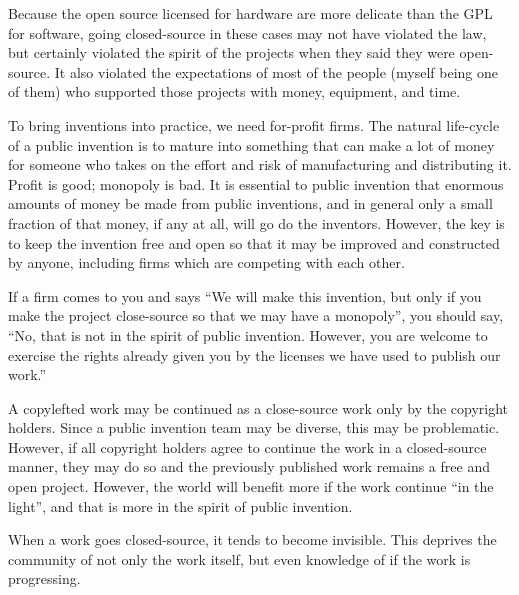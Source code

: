 \documentclass[
	fontsize=10pt, %
	twoside=false, %
	secnumdepth=1, %
]{kaobook}
\begin{document}
Because the open source licensed for hardware are
more delicate than the GPL for software, going
closed-source in these cases may not have violated
the law, but certainly violated the spirit of the
projects when they said they were open-source.
It also violated the expectations of most
of the people (myself being one of them)
who supported those projects with money,
equipment, and time.

To bring inventions into practice, we need
for-profit firms. The natural life-cycle
of a public invention is to mature into
something that can make a lot of money
for someone who takes on the effort and
risk of manufacturing and distributing it.
Profit is good; monopoly is bad.
It is essential to public invention that
enormous amounts of money be made from public inventions,
and in general only a small fraction of that money,
if any at all, will go do the inventors.
However, the key is to keep the invention
free and open so that it may be improved
and constructed by anyone, including firms
which are competing with each other.

If a firm comes to you and says
``We will make this invention, but only
if you make the project close-source so
that we may have a monopoly'', you should
say, ``No, that is not in the spirit of public invention.
However, you are welcome to exercise the rights
already given you by the licenses we have used to
publish our work.''

A copylefted work may be continued as a
close-source work only by the copyright holders.
Since a public invention team may be diverse,
this may be problematic. However, if all copyright
holders agree to continue the work in a closed-source
manner, they may do so and the previously published
work remains a free and open project.
However, the world will benefit more if the
work continue ``in the light'', and that
is more in the spirit of public invention.

When a work goes closed-source, it tends
to become invisible.
This deprives the community of not
only the work itself, but even knowledge of if the work is
progressing.
\end{document}

